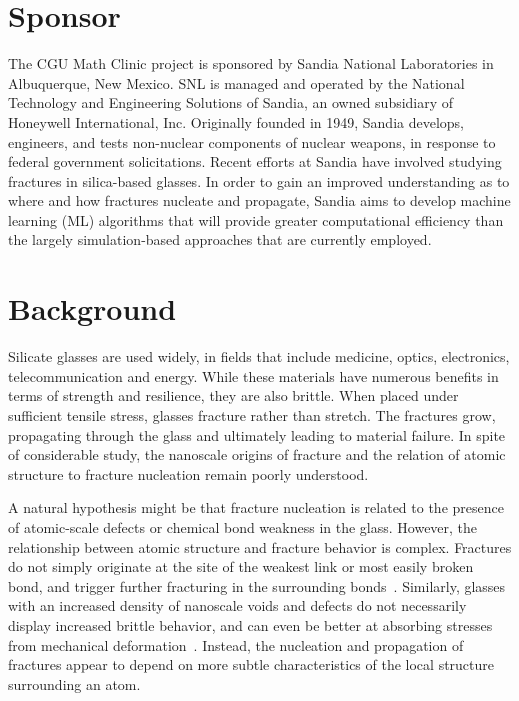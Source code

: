 \section{Sponsor}

The CGU Math Clinic project is sponsored by Sandia National Laboratories in Albuquerque, New Mexico. SNL is managed and operated by the National Technology and Engineering Solutions of Sandia, an owned subsidiary of Honeywell International, Inc. Originally founded in 1949, Sandia develops, engineers, and tests non-nuclear components of nuclear weapons, in response to federal government solicitations. Recent efforts at Sandia have involved studying fractures in silica-based glasses. In order to gain an improved understanding as to where and how fractures nucleate and propagate, Sandia aims to develop machine learning (ML) algorithms that will provide greater computational efficiency than the largely simulation-based approaches that are currently employed.


\section{Background}
Silicate glasses are used widely, in fields that include medicine, optics, electronics, telecommunication and energy. While these materials have numerous benefits in terms of strength and resilience, they are also brittle. When placed under sufficient tensile stress, glasses fracture rather than stretch. The fractures grow, propagating through the glass and ultimately leading to material failure. In spite of considerable study, the nanoscale origins of fracture and the relation of atomic structure to fracture nucleation remain poorly understood.

A natural hypothesis might be that fracture nucleation is related to the presence of atomic-scale defects or chemical bond weakness in the glass. However, the relationship between atomic structure and fracture behavior is complex. Fractures do not simply originate at the site of the weakest link or most easily broken bond, and trigger further fracturing in the surrounding bonds~\cite{markpres}. Similarly, glasses with an increased density of nanoscale voids and defects do not necessarily display increased brittle behavior, and can even be better at absorbing stresses from mechanical deformation~\cite{pedone2015dynamics}. Instead, the nucleation and propagation of fractures appear to depend on more subtle characteristics of the local structure surrounding an atom.

